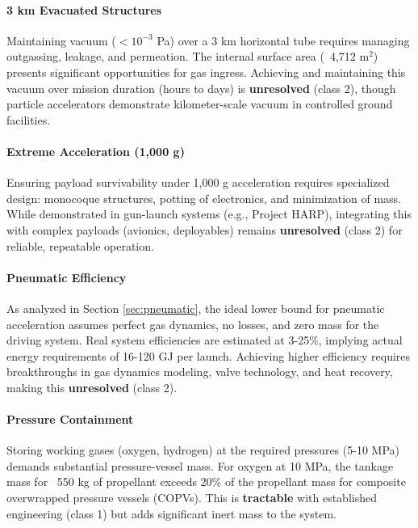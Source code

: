 \paragraph{3 km Evacuated Structures}
Maintaining vacuum ($<10^{-3}$ Pa) over a 3 km horizontal tube requires managing outgassing, leakage, and permeation. The internal surface area (~4,712 m$^2$) presents significant opportunities for gas ingress. Achieving and maintaining this vacuum over mission duration (hours to days) is \textbf{unresolved} (class 2), though particle accelerators demonstrate kilometer-scale vacuum in controlled ground facilities.

\paragraph{Extreme Acceleration (1,000 g)}
Ensuring payload survivability under 1,000 g acceleration requires specialized design: monocoque structures, potting of electronics, and minimization of mass. While demonstrated in gun-launch systems (e.g., Project HARP), integrating this with complex payloads (avionics, deployables) remains \textbf{unresolved} (class 2) for reliable, repeatable operation.

\paragraph{Pneumatic Efficiency}
As analyzed in Section \ref{sec:pneumatic}, the ideal lower bound for pneumatic acceleration assumes perfect gas dynamics, no losses, and zero mass for the driving system. Real system efficiencies are estimated at 3-25\%, implying actual energy requirements of 16-120 GJ per launch. Achieving higher efficiency requires breakthroughs in gas dynamics modeling, valve technology, and heat recovery, making this \textbf{unresolved} (class 2).

\paragraph{Pressure Containment}
Storing working gases (oxygen, hydrogen) at the required pressures (5-10 MPa) demands substantial pressure-vessel mass. For oxygen at 10 MPa, the tankage mass for ~550 kg of propellant exceeds 20\% of the propellant mass for composite overwrapped pressure vessels (COPVs). This is \textbf{tractable} with established engineering (class 1) but adds significant inert mass to the system.

